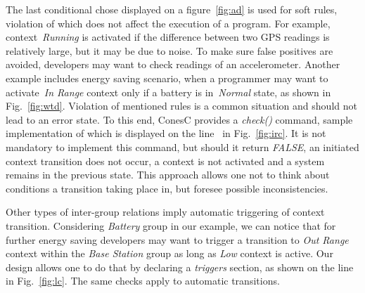 The last conditional chose displayed on a figure~\ref{fig:ad} is used for soft rules, violation of
which does not affect the execution of a program. For example, context~\emph{Running} is
activated if the difference between two GPS readings is relatively large, but it may be due to noise.
To make sure false positives are avoided, developers may want to check
readings of an accelerometer. Another example includes energy saving scenario,
when a programmer may want to activate~\emph{In Range} context only if a battery is
in~\emph{Normal} state, as shown in Fig.~\ref{fig:wtd}.
Violation of mentioned rules is a common situation and should not lead to an error state.
To this end, ConesC provides a \emph{check()} command, sample implementation of which is
displayed on the line~ in Fig.~\ref{fig:irc}. It is not mandatory to implement this
command, but should it return \emph{FALSE}, an initiated context transition does not occur,
a context is not activated and a system remains in the previous state.
This approach allows one not to think about conditions a transition taking
place in, but foresee possible inconsistencies.


Other types of inter-group relations imply automatic triggering of context
transition. Considering \emph{Battery} group in our example, we can notice that
for further energy saving developers may want to trigger a transition to
\emph{Out Range} context within the \emph{Base Station} group as long as
\emph{Low} context is active. Our design allows one to do that by declaring a
\emph{triggers} section, as shown on the line~ in Fig.~\ref{fig:lc}.
The same checks apply to automatic transitions.

